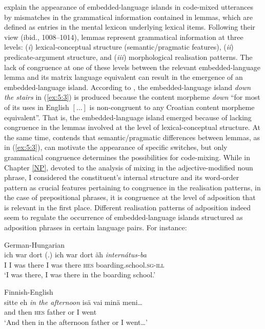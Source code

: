 \noindent \citet{myers-scotton-matching-1995} explain the appearance of embedded-language islands in code-mixed utterances by mismatches in the grammatical information contained in lemmas, which are defined as entries in the mental lexicon underlying lexical items. Following their view (ibid., 1008--1014), lemmas represent grammatical information at three levels: (\textit{i}) lexical-conceptual structure (semantic/pragmatic features), (\textit{ii}) predicate-argument structure, and (\textit{iii}) morphological realisation patterns. The lack of congruence at one of these levels between the relevant embedded-language lemma and its matrix language equivalent can result in the emergence of an embedded-language island. According to \cite[][227]{hlavac-second-generation-2003}, the embedded-language island \textit{down the stairs} in (\ref{ex:5:3}) is produced because the content morpheme \textit{down} ``for most of its uses in English \([\dots{}]\) is non-congruent to any Croatian content morpheme equivalent''. That is, the embedded-language island emerged because of lacking congruence in the lemmas involved at the level of lexical-conceptual structure. At the same time, \cite[258]{deuchar-congruence-2005} contends that semantic/pragmatic differences between lemmas, as in (\ref{ex:5:3}), can motivate the appearance of specific switches, but only grammatical congruence determines the possibilities for code-mixing. While in Chapter \ref{NP}, devoted to the analysis of mixing in the adjective-modified noun phrase, I considered the constituent's internal structure and its word-order pattern as crucial features pertaining to congruence in the realisation patterns, in the case of prepositional phrases, it is congruence at the level of adposition that is relevant in the first place. Different realisation patterns of adposition indeed seem to regulate the occurrence of embedded-language islands structured as adposition phrases in certain language pairs. For instance:

\ea
\label{ex:5:4}
German-Hungarian \citep[435]{szabo-language-2010}\\
 {ich} {war} {dort (.)} {ich} {war} {dort} {äh} \textit{internátus-ba}\\
	{I} I was there I was there \textsc{hes} boarding.school.\textsc{sg-ill}\\
\glt `I was there, I was there in the boarding school.'
\z

\ea
\label{ex:5:5}
Finnish-English \citep[226]{lehtinen-analysis-1966}\\
 {sitte} {eh} \textit{in the afternoon} {isä} {vai} {minä} {meni\dots{}}\\
	{and} then \textsc{hes} {} father or I went\\
\glt `And then in the afternoon father or I went\dots{}'
\z

